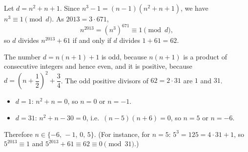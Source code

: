 Let $d=n^2+n+1$. Since $n^3-1=(n-1)(n^2+n+1)$, we have $n^3\equiv1\pmod d$. As $2013=3\cdot671$,
\[
n^{2013}=\left(n^3\right)^{671}\equiv1\pmod d,
\]
so $d$ divides $n^{2013}+61$ if and only if $d$ divides $1+61=62$.

The number $d=n(n+1)+1$ is odd, because $n(n+1)$ is a product of consecutive integers and hence even, and it is positive, because $d=\left(n+\dfrac{1}{2}\right)^2+\dfrac{3}{4}$. The odd positive divisors of $62=2\cdot31$ are $1$ and $31$.
\begin{itemize}
\item $d=1$: $n^2+n=0$, so $n=0$ or $n=-1$.
\item $d=31$: $n^2+n-30=0$, i.e.\ $(n-5)(n+6)=0$, so $n=5$ or $n=-6$.
\end{itemize}
Therefore $n\in\boxed{\{-6,\,-1,\,0,\,5\}}$. (For instance, for $n=5$: $5^3=125=4\cdot31+1$, so $5^{2013}\equiv1$ and $5^{2013}+61\equiv62\equiv0\pmod{31}$.)
